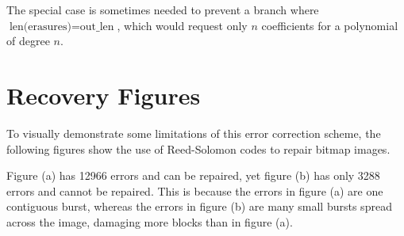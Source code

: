 The special case is sometimes needed to prevent a branch where $\text{len(erasures)} = \text{out\_len}$, which would request only $n$ coefficients for a polynomial of degree $n$.

\clearpage

\section{Recovery Figures}
\label{appendix:bitmap-errors}

To visually demonstrate some limitations of this error correction scheme, the following figures show the use of Reed-Solomon codes to repair bitmap images.

Figure (a) has 12966 errors and can be repaired, yet figure (b) has only 3288 errors and cannot be repaired.
This is because the errors in figure (a) are one contiguous burst, whereas the errors in figure (b) are many small bursts spread across the image, damaging more blocks than in figure (a).

